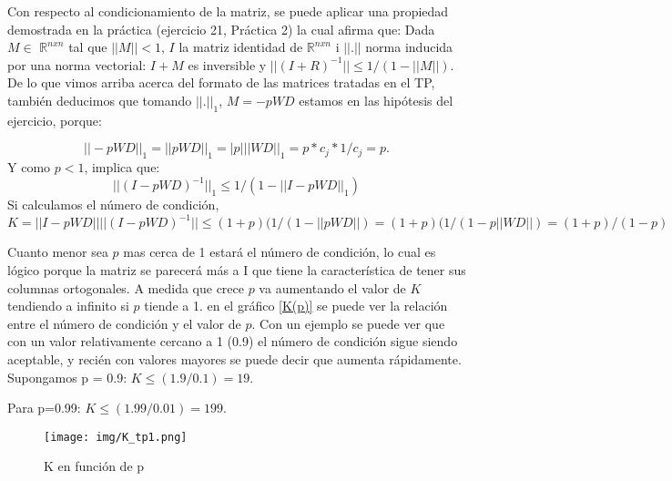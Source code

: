 Con respecto al condicionamiento de la matriz, se puede aplicar una propiedad demostrada en la práctica (ejercicio 21, Práctica 2) la cual afirma que: Dada $M \in$ $\mathbb{R}^{nxn}$ tal que $||M||<1$, $I$ la matriz identidad de $\mathbb{R}^{nxn}$ 
i $||.||$ norma inducida por una norma vectorial: $I+M$ es inversible y $||(I+R)^{-1}||\leq 1/(1-||M||)$.\\

De lo que vimos arriba acerca del formato de las matrices tratadas en el TP, también deducimos que tomando $||.||_1$, $M = -pWD$ estamos en las hipótesis del ejercicio, porque:

\begin{displaymath}
||-pWD||_1=||pWD||_1=|p|||WD||_1=p*c_j*1/c_j=p.
\end{displaymath}
Y como $p<1$, implica que:
\begin{displaymath}
||(I-pWD)^{-1}||_1\leq 1/(1-||I-pWD||_1)
\end{displaymath}
Si calculamos el número de condición,
\begin{displaymath}
K=||I-pWD||||(I-pWD)^{-1}||\leq (1+p) (1/(1-||pWD||)=(1+p) (1/(1-p||WD||)=(1+p)/(1-p)
\end{displaymath}

Cuanto menor sea $p$ mas cerca de 1 estará el número de condición, lo cual es lógico porque la matriz se parecerá más a I que tiene la característica de tener sus columnas ortogonales. A medida que crece $p$ va aumentando el valor de $K$ tendiendo a infinito si $p$ tiende a 1. en el gráfico \ref{K(p)} se puede ver la relación entre el número de condición y el valor de $p$. Con un ejemplo se puede ver que con un valor relativamente cercano a 1 (0.9) el número de condición sigue siendo aceptable, y recién con valores mayores se puede decir que aumenta rápidamente.
Supongamos p = 0.9:
$K\leq (1.9/0.1)=19$.

Para p=0.99: 
$K\leq (1.99/0.01)=199$. 

\begin{figure}
  \centering
    \texttt{[image: img/K\_tp1.png]}
  \caption{K en función de p}
  \label{fig:K(p)}
\end{figure}